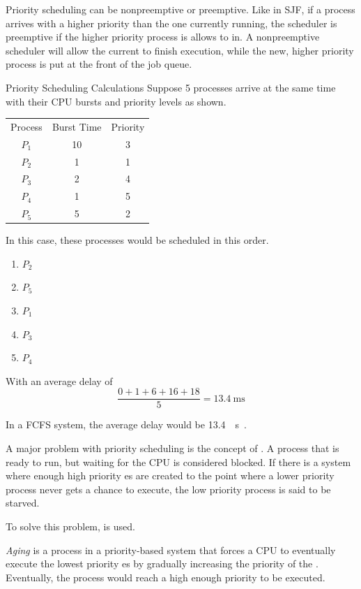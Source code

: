 Priority scheduling can be nonpreemptive or preemptive.
Like in SJF, if a process arrives with a higher priority than the one currently running, the scheduler is preemptive if the higher priority process is allows to  in.
A nonpreemptive scheduler will allow the current  to finish execution, while the new, higher priority process is put at the front of the job queue.

\begin{example}[]{Priority Scheduling Calculations}
  Suppose 5 processes arrive at the same time with their CPU bursts and priority levels as shown.
  \begin{center}
    \begin{tabular}{ccc}
      \toprule
      Process & Burst Time & Priority \\
      $P_{1}$ & 10 & 3 \\
      $P_{2}$ & 1 & 1 \\
      $P_{3}$ & 2 & 4 \\
      $P_{4}$ & 1 & 5 \\
      $P_{5}$ & 5 & 2 \\
      \bottomrule
    \end{tabular}
  \end{center}
  \tcblower{}
  In this case, these processes would be scheduled in this order.
  \begin{enumerate}[noitemsep]
  \item $P_{2}$
  \item $P_{5}$
  \item $P_{1}$
  \item $P_{3}$
  \item $P_{4}$
  \end{enumerate}
  With an average delay of
  \begin{equation*}
    \frac{0+1+6+16+18}{5} = \SI{13.4}{\milli \second}
  \end{equation*}

  In a FCFS system, the average delay would be \SI{13.4}{\milli{} \second{}}.
\end{example}

A major problem with priority scheduling is the concept of .
A process that is ready to run, but waiting for the CPU is considered blocked.
If there is a system where enough high priority es are created to the point where a lower priority process never gets a chance to execute, the low priority process is said to be starved.

To solve this problem,   is used.

\begin{definition}[Aging]\label{def:Aging}
  \emph{Aging} is a process in a priority-based system that forces a CPU to eventually execute the lowest priority es by gradually increasing the priority of the .
  Eventually, the process would reach a high enough priority to be executed.
\end{definition}

